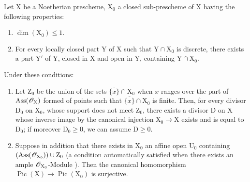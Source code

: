\begin{proposition}[21.9.11]
\label{IV.21.9.11}
Let $\mathrm{X}$ be a Noetherian prescheme, $\mathrm{X}_0$ a closed sub-prescheme of $\mathrm{X}$ having the following properties:
\begin{enumerate}
  \item[\rm 1\textsuperscript{o}] $\dim(\mathrm{X}_0)\leq 1$.
  \item[\rm 2\textsuperscript{o}] For every locally closed part $\mathrm{Y}$ of $\mathrm{X}$ such that $\mathrm{Y}\cap\mathrm{X}_0$ is discrete, there exists a part $\mathrm{Y}'$ of $\mathrm{Y}$, closed in $\mathrm{X}$ and open in $\mathrm{Y}$, containing $\mathrm{Y}\cap\mathrm{X}_0$.
\end{enumerate}
Under these conditions:
\begin{enumerate}[label=\textup{(\roman*)}]
  \item Let $\mathrm{Z}_0$ be the union of the sets $\overline{\{x\}}\cap\mathrm{X}_0$ when $x$ ranges over the part of $\operatorname{Ass}(\mathscr{O}_\mathrm{X})$ formed of points such that $\overline{\{x\}}\cap\mathrm{X}_0$ is finite.
Then, for every divisor $\mathrm{D}_0$ on $\mathrm{X}_0$, whose support does not meet $\mathrm{Z}_0$, there exists a divisor $\mathrm{D}$ on $\mathrm{X}$ whose inverse image by the canonical injection $\mathrm{X}_0\to\mathrm{X}$ exists  and is equal to $\mathrm{D}_0$;
if moreover $\mathrm{D}_0\geq 0$, we can assume $\mathrm{D}\geq 0$.

  \item Suppose in addition that there exists in $\mathrm{X}_0$ an affine open $\mathrm{U}_0$ containing $(\operatorname{Ass}(\mathscr{O}_{\mathrm{X}_0}))\cup\mathrm{Z}_0$ \textup{(}a condition automatically satisfied when there exists an ample $\mathscr{O}_{\mathrm{X}_0}$-Module \textup{)}.
Then the canonical homomorphism  $\operatorname{Pic}(\mathrm{X})\to\operatorname{Pic}(\mathrm{X}_0)$ is surjective.
\end{enumerate}
\end{proposition}

